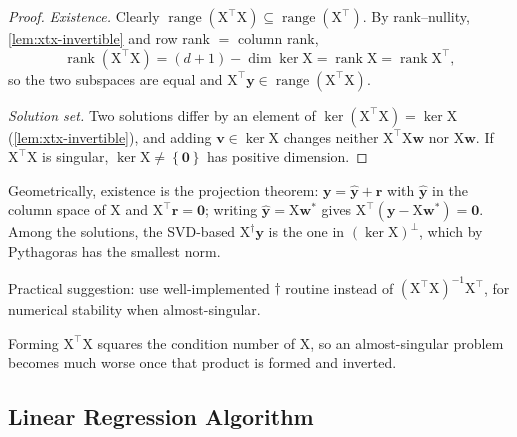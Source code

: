 \begin{proof}
    \emph{Existence.} Clearly \(\operatorname{range}(\mathrm{X}^\top
    \mathrm{X}) \subseteq \operatorname{range}(\mathrm{X}^\top)\). By
    rank--nullity, \autoref{lem:xtx-invertible} and row rank \(=\) column rank,
    \[
        \operatorname{rank}(\mathrm{X}^\top \mathrm{X}) = (d+1) - \dim \ker
        \mathrm{X} = \operatorname{rank} \mathrm{X} = \operatorname{rank}
        \mathrm{X}^\top ,
    \]
    so the two subspaces are equal and \(\mathrm{X}^\top \bm{y} \in
    \operatorname{range}(\mathrm{X}^\top \mathrm{X})\).

    \emph{Solution set.} Two solutions differ by an element of
    \(\ker(\mathrm{X}^\top \mathrm{X}) = \ker \mathrm{X}\)
    (\autoref{lem:xtx-invertible}), and adding \(\bm{v} \in \ker \mathrm{X}\)
    changes neither \(\mathrm{X}^\top \mathrm{X} \bm{w}\) nor \(\mathrm{X}
    \bm{w}\). If \(\mathrm{X}^\top \mathrm{X}\) is singular, \(\ker \mathrm{X}
    \neq \left\{ \bm{0} \right\}\) has positive dimension.
\end{proof}

Geometrically, existence is the projection theorem: \(\bm{y} = \hat{\bm{y}} +
\bm{r}\) with \(\hat{\bm{y}}\) in the column space of \(\mathrm{X}\) and
\(\mathrm{X}^\top \bm{r} = \bm{0}\); writing \(\hat{\bm{y}} = \mathrm{X}
\bm{w}^*\) gives \(\mathrm{X}^\top (\bm{y} - \mathrm{X} \bm{w}^*) = \bm{0}\).
Among the solutions, the SVD-based \(\mathrm{X}^\dagger \bm{y}\) is the one in
\((\ker \mathrm{X})^\perp\), which by Pythagoras has the smallest norm.

\begin{moral}
    Practical suggestion: use well-implemented \(\dagger\) routine instead of
    \(\left( \mathrm{X}^\top \mathrm{X} \right)^{-1} \mathrm{X}^\top\), for
    numerical stability when almost-singular.
\end{moral}

Forming \(\mathrm{X}^\top \mathrm{X}\) squares the condition number of
\(\mathrm{X}\), so an almost-singular problem becomes much worse once that
product is formed and inverted.

\subsection{Linear Regression Algorithm}

